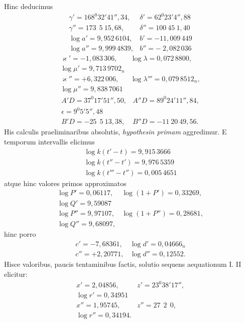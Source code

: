 Hinc deducimus
\[
\begin{array}{ll}
\gamma' = 168^{0}32'41''{,}34, & \delta' = 62^{0}23'4''{,}88 \\
\gamma'' = 173\ \ 5\ 15{,}68, & \delta'' = 100\ 45\ 1{,}40 \\
\log a' = 9{,}952\,6104, & b' = -11{,}009\,449 \\
\log a'' = 9{,}999\,4839, & b'' = -\ 2{,}082\,036
\end{array}
\]
\[
\begin{array}{ll}
\varkappa' = -1{,}083\,306, & \log \lambda = 0{,}072\,8800,\\
\log \mu' = 9{,}713\,9702_n & \\
\varkappa'' = +6{,}322\,006, & \log \lambda''' = 0{,}079\,8512_n,\\
\log \mu'' = 9{,}838\,7061 & 
\end{array}
\]
\[
\begin{array}{ll}
A'D = 37^{0}17'51''{,}50, & A''D = 89^{0}24'11''{,}84,\\
\epsilon = 9^{0}5'5''{,}48 & \\
B'D = -25\ \ 5\ 13{,}38, & B''D = -11\ 20\ 49{,}56.
\end{array}
\]
His calculis praeliminaribus absolutis, \emph{hypothesin primam} aggredimur. E
temporum intervallis elicimus
\[
\begin{array}{l}
\log k(t'-t) = 9{,}915\,3666 \\
\log k(t''-t') = 9{,}976\,5359 \\
\log k(t'''-t'') = 0{,}005\,4651
\end{array}
\]
atque hinc valores primos approximatos
\[
\begin{array}{ll}
\log P' = 0{,}06117, & \log(1+P') = 0{,}33269,\\
\log Q' = 9{,}59087 & \\
\log P'' = 9{,}97107, & \log(1+P'') = 0{,}28681,\\
\log Q'' = 9{,}68097, & 
\end{array}
\]
hinc porro
\[
\begin{array}{ll}
c' = -7{,}68361, & \log d' = 0{,}04666_n \\
c'' = +2{,}20771, & \log d'' = 0{,}12552.
\end{array}
\]
Hisce valoribus, paucis tentaminibus factis, solutio sequens aequationum I. II
elicitur:
\[
\begin{array}{ll}
x' = 2{,}04856, & z' = 23^{0}38'17'',\\
\log r' = 0{,}34951 & \\
x'' = 1{,}95745, & z'' = 27\ \ 2\ \ 0,\\
\log r'' = 0{,}34194. & 
\end{array}
\]

